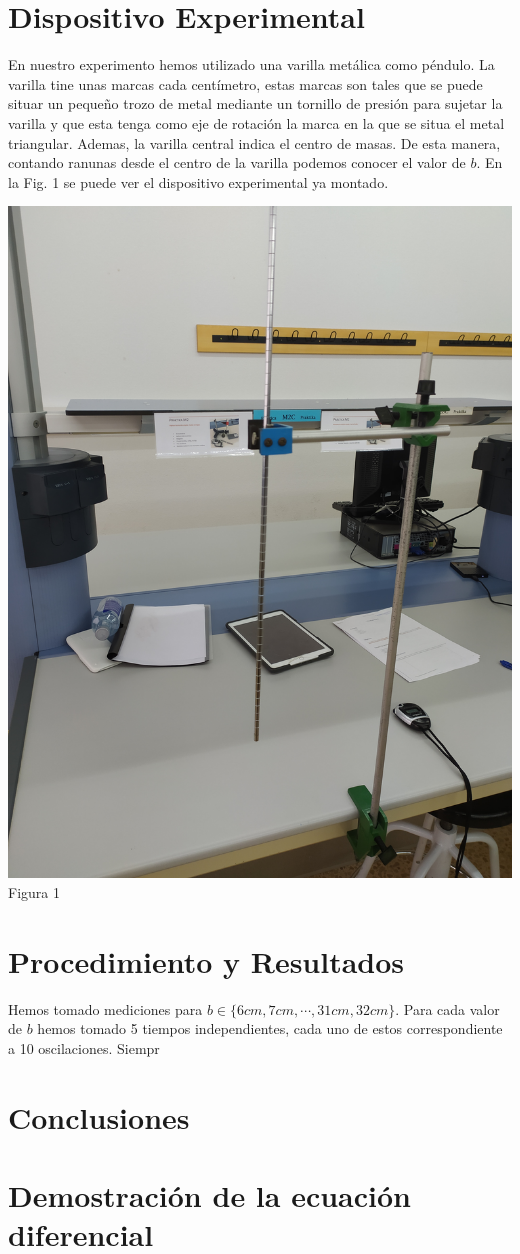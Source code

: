 \documentclass{article}
\begin{document}
\begin{multicols}{2}
\section{Dispositivo Experimental}
En nuestro experimento hemos utilizado una varilla metálica como péndulo. La varilla tine unas marcas cada centímetro, estas marcas son tales que se puede situar un pequeño trozo de metal mediante un tornillo de presión para sujetar la varilla y que esta tenga como eje de rotación la marca en la que se situa el metal triangular. Ademas, la varilla central indica el centro de masas. De esta manera, contando ranunas desde el centro de la varilla podemos conocer el valor de $b$. En la Fig. 1 se puede ver el dispositivo experimental ya montado.
\begin{center}
    \includegraphics[scale=0.05, angle=-90]{figures/c2.png}\\
    Figura 1
\end{center}

\section{Procedimiento y Resultados}
Hemos tomado mediciones para $b\in \{6cm, 7cm, \cdots, 31cm, 32cm\}$. Para cada valor de $b$ hemos tomado 5 tiempos independientes, cada uno de estos correspondiente a 10 oscilaciones. Siempr


\section{Conclusiones}


\end{multicols}
\appendix

\section{Demostración de la ecuación diferencial}
\end{document}
